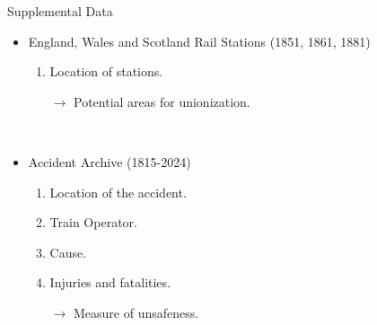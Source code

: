 \begin{frame}{Supplemental Data}
    \begin{itemize}
        \item England, Wales and Scotland Rail Stations (1851, 1861, 1881)
        \begin{enumerate}
            \item Location of stations.

            $\rightarrow$\color{red} Potential areas for unionization. \color{black}
        \end{enumerate}

        \

        \item Accident Archive (1815-2024)
        \begin{enumerate}
            \item Location of the accident.
            
            \item Train Operator.

            \item Cause.

            \item Injuries and fatalities.

            $\rightarrow$\color{red} Measure of unsafeness. \color{black}
        \end{enumerate}
    \end{itemize}
\end{frame}